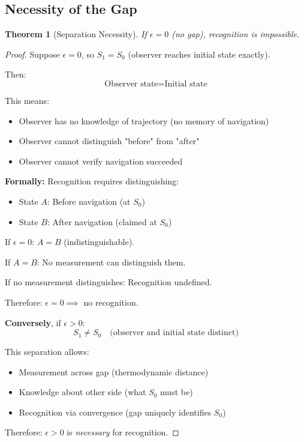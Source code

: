 \documentclass[twocolumn,10pt]{revtex4-2}
\newtheorem{theorem}{Theorem}[section]
\theoremstyle{definition}
\theoremstyle{remark}
\begin{document}
\subsection{Necessity of the Gap}

\begin{theorem}[Separation Necessity]
\label{thm:separation_necessity}
If $\epsilon = 0$ (no gap), recognition is impossible.
\end{theorem}

\begin{proof}
Suppose $\epsilon = 0$, so $S_1 = S_0$ (observer reaches initial state exactly).

Then:
\begin{equation}
\text{Observer state} = \text{Initial state}
\end{equation}

This means:
\begin{itemize}
\item Observer has no knowledge of trajectory (no memory of navigation)
\item Observer cannot distinguish "before" from "after"
\item Observer cannot verify navigation succeeded
\end{itemize}

\vspace{0.2cm}
\noindent\textbf{Formally:} Recognition requires distinguishing:
\begin{itemize}
\item State $A$: Before navigation (at $S_0$)
\item State $B$: After navigation (claimed at $S_0$)
\end{itemize}

If $\epsilon = 0$: $A = B$ (indistinguishable).

If $A = B$: No measurement can distinguish them.

If no measurement distinguishes: Recognition undefined.

Therefore: $\epsilon = 0 \implies$ no recognition.

\vspace{0.2cm}
\noindent\textbf{Conversely}, if $\epsilon > 0$:
\begin{equation}
S_1 \neq S_0 \quad \text{(observer and initial state distinct)}
\end{equation}

This separation allows:
\begin{itemize}
\item Measurement across gap (thermodynamic distance)
\item Knowledge about other side (what $S_0$ must be)
\item Recognition via convergence (gap uniquely identifies $S_0$)
\end{itemize}

Therefore: $\epsilon > 0$ is \textit{necessary} for recognition.
\end{proof}
\end{document}
